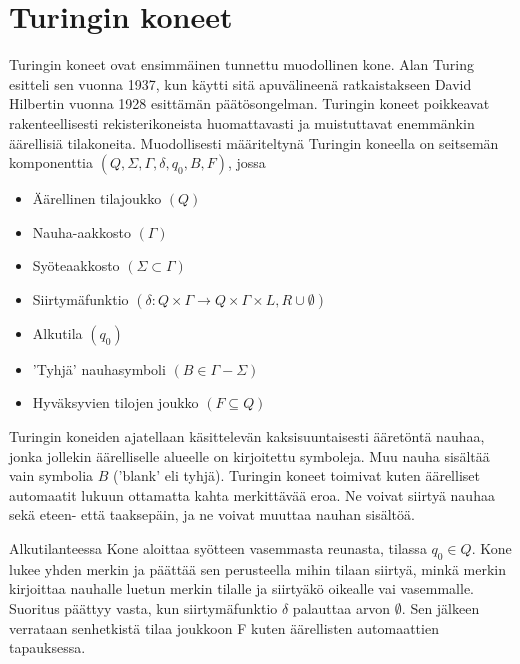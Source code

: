 \documentclass[a4paper, 12pt]{article}
\begin{document}


\section{Turingin koneet}
Turingin koneet ovat ensimmäinen tunnettu muodollinen kone. Alan Turing esitteli sen vuonna 1937, kun käytti sitä apuvälineenä ratkaistakseen David Hilbertin vuonna 1928 esittämän päätösongelman.
Turingin koneet poikkeavat rakenteellisesti rekisterikoneista huomattavasti ja muistuttavat enemmänkin äärellisiä tilakoneita. Muodollisesti määriteltynä Turingin koneella on seitsemän komponenttia $(Q, \Sigma, \Gamma, \delta, q_0, B, F)$, jossa

\begin{itemize}
\item Äärellinen tilajoukko $(Q)$
\item Nauha-aakkosto $(\Gamma)$
\item Syöteaakkosto $(\Sigma \subset \Gamma)$
\item Siirtymäfunktio $(\delta : Q \times \Gamma \rightarrow Q \times \Gamma \times {L,R} \cup {\emptyset})$
\item Alkutila $(q_0)$
\item 'Tyhjä' nauhasymboli $(B \in \Gamma - \Sigma)$
\item Hyväksyvien tilojen joukko $(F \subseteq Q)$
\end{itemize}

Turingin koneiden ajatellaan käsittelevän kaksisuuntaisesti ääretöntä nauhaa, jonka jollekin äärelliselle alueelle on kirjoitettu symboleja. Muu nauha sisältää vain symbolia $B$ ('blank' eli tyhjä).
Turingin koneet toimivat kuten äärelliset automaatit lukuun ottamatta kahta merkittävää eroa. Ne voivat siirtyä nauhaa sekä eteen- että taaksepäin, ja ne voivat muuttaa nauhan sisältöä.

Alkutilanteessa Kone aloittaa syötteen vasemmasta reunasta, tilassa $q_0 \in Q$. Kone lukee yhden merkin ja päättää sen perusteella mihin tilaan siirtyä, minkä merkin kirjoittaa nauhalle luetun merkin tilalle ja siirtyäkö oikealle vai vasemmalle. Suoritus päättyy vasta, kun siirtymäfunktio $\delta$ palauttaa arvon $\emptyset$. Sen jälkeen verrataan senhetkistä tilaa joukkoon F kuten äärellisten automaattien tapauksessa.
\end{document}
